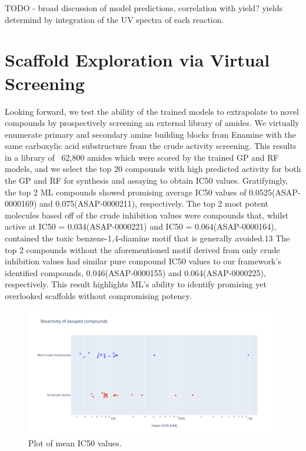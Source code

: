 TODO - broad discussion of model predictions, correlation with yield?
yields determind by integration of the UV spectra of each reaction.

\section{Scaffold Exploration via Virtual Screening}

Looking forward, we test the ability of the trained models to extrapolate to novel compounds by prospectively screening an external library of amides. We virtually enumerate primary and secondary amine building blocks from Enamine with the same carboxylic acid substructure from the crude activity screening. This results in a library of ~62,800 amides which were scored by the trained GP and RF models, and we select the top 20 compounds with high predicted activity for both the GP and RF for synthesis and assaying to obtain IC50 values. Gratifyingly, the top 2 ML compounds showed promising average IC50 values of 0.0525\uM (ASAP-0000169) and 0.075\uM (ASAP-0000211), respectively. The top 2 most potent molecules based off of the crude inhibition values were compounds that, whilst active at IC50 = 0.034\uM (ASAP-0000221) and IC50 = 0.064\uM (ASAP-0000164), contained the toxic benzene-1,4-diamine motif that is generally avoided.13 The top 2 compounds without the aforementioned motif derived from only crude inhibition values had similar pure compound IC50 values to our framework's identified compounds, 0.046\uM (ASAP-0000155) and 0.064\uM (ASAP-0000225), respectively. This result highlights ML's ability to identify promising yet overlooked scaffolds without compromising potency. 

\begin{figure}
    \centering
             \includegraphics[width=\textwidth]{Chapters/Crude/Figs/strip_plot.pdf}
        \caption{Plot of mean IC50 values.}
        \label{fig:strip}
    \end{figure}

